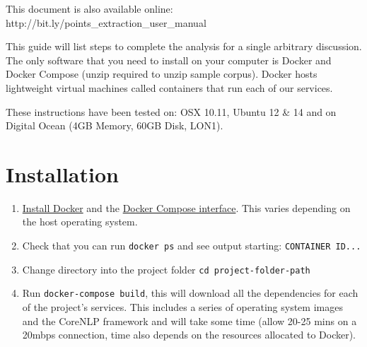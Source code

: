 This document is also available online: \\ http://bit.ly/points\_extraction\_user\_manual

\noindent\hrulefill

\noindent This guide will list steps to complete the analysis for a single arbitrary discussion. The only software that you need to install on your computer is Docker and Docker Compose (unzip required to unzip sample corpus). Docker hosts lightweight virtual machines called containers that run each of our services.

These instructions have been tested on: OSX 10.11, Ubuntu 12 \& 14 and on Digital Ocean (4GB Memory, 60GB Disk, LON1).

\section{Installation}
\begin{enumerate}
	\item{\href{https://docs.docker.com/engine/installation/}{Install Docker} and the \href{https://docs.docker.com/compose/install/}{Docker Compose interface}. This varies depending on the host operating system.}
	\item{Check that you can run \texttt{docker ps} and see output starting: \texttt{CONTAINER ID...}}
	\item{Change directory into the project folder \texttt{cd {project-folder-path}}}
	\item{Run \texttt{docker-compose build}, this will download all the dependencies for each of the project's services. This includes a series of operating system images and the CoreNLP framework and will take some time (allow 20-25 mins on a 20mbps connection, time also depends on the resources allocated to Docker).}
\end{enumerate}

